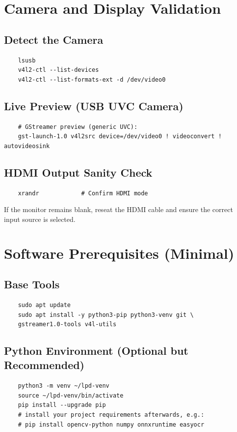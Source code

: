 \section{Camera and Display Validation}

\subsection*{Detect the Camera}
\begin{verbatim}
	lsusb
	v4l2-ctl --list-devices
	v4l2-ctl --list-formats-ext -d /dev/video0
\end{verbatim}

\subsection*{Live Preview (USB UVC Camera)}
\begin{verbatim}
	# GStreamer preview (generic UVC):
	gst-launch-1.0 v4l2src device=/dev/video0 ! videoconvert ! autovideosink
\end{verbatim}

\subsection*{HDMI Output Sanity Check}
\begin{verbatim}
	xrandr            # Confirm HDMI mode
\end{verbatim}

If the monitor remains blank, reseat the HDMI cable and ensure the correct input source is selected.

\section{Software Prerequisites (Minimal)}

\subsection*{Base Tools}
\begin{verbatim}
	sudo apt update
	sudo apt install -y python3-pip python3-venv git \
	gstreamer1.0-tools v4l-utils
\end{verbatim}

\subsection*{Python Environment (Optional but Recommended)}
\begin{verbatim}
	python3 -m venv ~/lpd-venv
	source ~/lpd-venv/bin/activate
	pip install --upgrade pip
	# install your project requirements afterwards, e.g.:
	# pip install opencv-python numpy onnxruntime easyocr
\end{verbatim}


